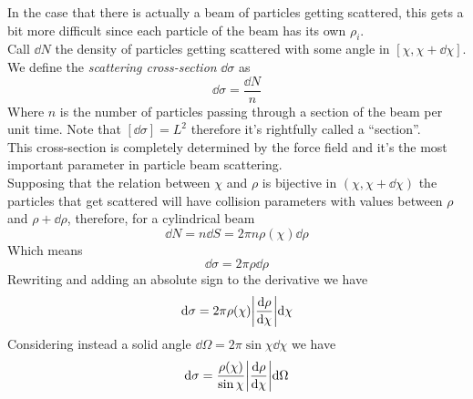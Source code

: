 \documentclass[../admech.tex]{subfiles}
\begin{document}
In the case that there is actually a beam of particles getting scattered, this gets a bit more difficult since each particle of the beam has its own $\rho_i$.\\
Call $\dd N$ the density of particles getting scattered with some angle in $[\chi,\chi+\dd\chi]$. We define the \emph{scattering cross-section} $\dd\sigma$ as
\begin{equation}
	\dd\sigma=\frac{\dd N}{n}
	\label{eq:crosssec}
\end{equation}
Where $n$ is the number of particles passing through a section of the beam per unit time. Note that $[\dd\sigma]=L^2$ therefore it's rightfully called a ``section''.\\
This cross-section is completely determined by the force field and it's the most important parameter in particle beam scattering.\\
Supposing that the relation between $\chi$ and $\rho$ is bijective in $(\chi,\chi+\dd\chi)$ the particles that get scattered will have collision parameters with values between $\rho$ and $\rho+\dd\rho$, therefore, for a cylindrical beam
\begin{equation*}
	\dd N=n\dd S=2\pi n\rho(\chi)\dd\rho
\end{equation*}
Which means
\begin{equation*}
	\dd\sigma=2\pi\rho\dd\rho
\end{equation*}
Rewriting and adding an absolute sign to the derivative we have
\begin{equation}
	\dd\sigma=2\pi\rho(\chi)\abs{\dv{\rho}{\chi}}\dd\chi
	\label{eq:csrhochi}
\end{equation}
Considering instead a solid angle $\dd\Omega=2\pi\sin\chi\dd\chi$ we have
\begin{equation}
	\dd\sigma=\frac{\rho(\chi)}{\sin\chi}\abs{\dv{\rho}{\chi}}\dd\Omega
	\label{eq:cs3d}
\end{equation}
\end{document}
